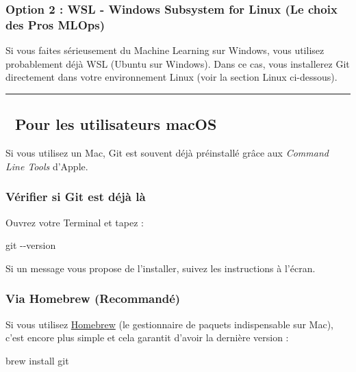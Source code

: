 \documentclass[
  letterpaper,
  DIV=11,
  numbers=noendperiod]{scrreprt}
\newenvironment{Shaded}{\begin{snugshade}}{\end{snugshade}}
\newcommand{\AttributeTok}[1]{\textcolor[rgb]{0.40,0.45,0.13}{#1}}
\newcommand{\ExtensionTok}[1]{\textcolor[rgb]{0.00,0.23,0.31}{#1}}
\newcommand{\FunctionTok}[1]{\textcolor[rgb]{0.28,0.35,0.67}{#1}}
\newcommand{\NormalTok}[1]{\textcolor[rgb]{0.00,0.23,0.31}{#1}}
\begin{document}
\subsubsection{Option 2 : WSL - Windows Subsystem for Linux (Le choix
des Pros
MLOps)}\label{option-2-wsl---windows-subsystem-for-linux-le-choix-des-pros-mlops}

Si vous faites sérieusement du Machine Learning sur Windows, vous
utilisez probablement déjà WSL (Ubuntu sur Windows). Dans ce cas, vous
installerez Git directement dans votre environnement Linux (voir la
section Linux ci-dessous).

\begin{center}\rule{0.5\linewidth}{0.5pt}\end{center}

\subsection{🍎 Pour les utilisateurs
macOS}\label{pour-les-utilisateurs-macos}

Si vous utilisez un Mac, Git est souvent déjà préinstallé grâce aux
\emph{Command Line Tools} d'Apple.

\subsubsection{Vérifier si Git est déjà
là}\label{vuxe9rifier-si-git-est-duxe9juxe0-luxe0}

Ouvrez votre Terminal et tapez :

\begin{Shaded}
\begin{Highlighting}[]
\FunctionTok{git} \AttributeTok{{-}{-}version}
\end{Highlighting}
\end{Shaded}

Si un message vous propose de l'installer, suivez les instructions à
l'écran.

\subsubsection{Via Homebrew
(Recommandé)}\label{via-homebrew-recommanduxe9}

Si vous utilisez \href{https://brew.sh/}{Homebrew} (le gestionnaire de
paquets indispensable sur Mac), c'est encore plus simple et cela
garantit d'avoir la dernière version :

\begin{Shaded}
\begin{Highlighting}[]
\ExtensionTok{brew}\NormalTok{ install git}
\end{Highlighting}
\end{Shaded}
\end{document}
